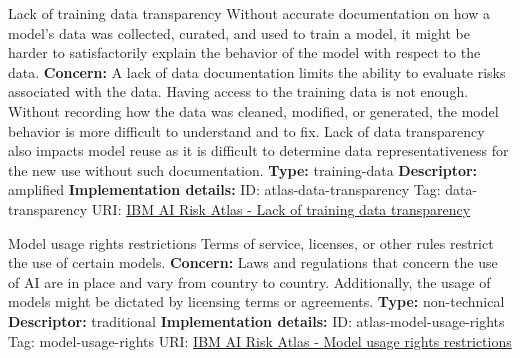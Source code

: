 \documentclass[a4paper,12pt]{article}
\begin{document}
\begin{definitionbox}{Lack of training data transparency}
Without accurate documentation on how a model's data was collected, curated, and used to train a model, it might be harder to satisfactorily explain the behavior of the model with respect to the data.\newline\newline
\textbf{Concern: }A lack of data documentation limits the ability to evaluate risks associated with the data. Having access to the training data is not enough. Without recording how the data was cleaned, modified, or generated, the model behavior is more difficult to understand and to fix. Lack of data transparency also impacts model reuse as it is difficult to determine data representativeness for the new use without such documentation.\newline\newline
\textbf{Type: }training-data\newline
\textbf{Descriptor: }amplified \newline\newline
\textbf{Implementation details: } \newline
ID: atlas-data-transparency \newline
Tag: data-transparency \newline
URI:  \href{https://www.ibm.com/docs/en/watsonx/saas?topic=SSYOK8/wsj/ai-risk-atlas/data-transparency.html}{IBM AI Risk Atlas - Lack of training data transparency}\newline
\end{definitionbox}
\begin{definitionbox}{Model usage rights restrictions}
Terms of service, licenses, or other rules restrict the use of certain models.\newline\newline
\textbf{Concern: }Laws and regulations that concern the use of AI are in place and vary from country to country. Additionally, the usage of models might be dictated by licensing terms or agreements.\newline\newline
\textbf{Type: }non-technical\newline
\textbf{Descriptor: }traditional \newline\newline
\textbf{Implementation details: } \newline
ID: atlas-model-usage-rights \newline
Tag: model-usage-rights \newline
URI:  \href{https://www.ibm.com/docs/en/watsonx/saas?topic=SSYOK8/wsj/ai-risk-atlas/model-usage-rights.html}{IBM AI Risk Atlas - Model usage rights restrictions}\newline
\end{definitionbox}
\end{document}
